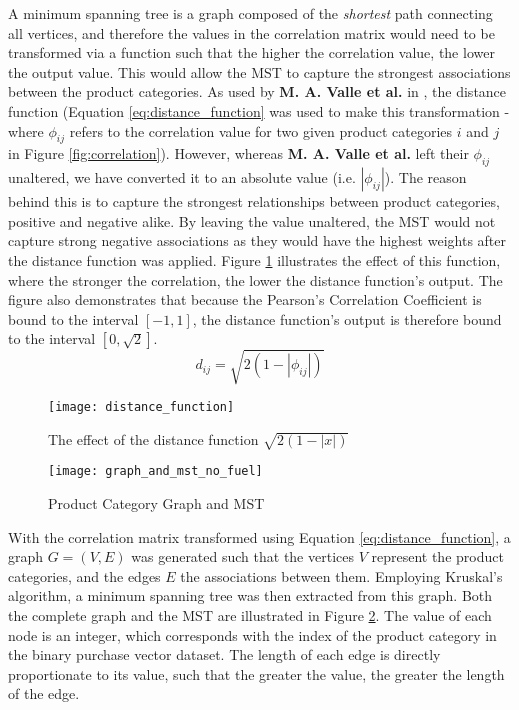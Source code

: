A minimum spanning tree is a graph composed of the \textit{shortest} path connecting all vertices, and therefore the values in the correlation matrix would need to be transformed via a function such that the higher the correlation value, the lower the output value. This would allow the MST to capture the strongest associations between the product categories. As used by \textbf{M. A. Valle et al.} in \cite{mst_paper}, the distance function (Equation \ref{eq:distance_function}  was used to make this transformation - where $\phi_{ij}$ refers to the correlation value for two given product categories $i$ and $j$ in Figure \ref{fig:correlation}). However, whereas \textbf{M. A. Valle et al.} left their $\phi_{ij}$ unaltered, we have converted it to an absolute value (i.e. $|\phi_{ij}|$). The reason behind this is to capture the strongest relationships between product categories, positive and negative alike. By leaving the value unaltered, the MST would not capture strong negative associations as they would have the highest weights after the distance function was applied. Figure \ref{fig:distance_function} illustrates the effect of this function, where the stronger the correlation, the lower the distance function's output. The figure also demonstrates that because the Pearson's Correlation Coefficient is bound to the interval $[-1,1]$, the distance function's output is therefore bound to the interval $[0,\sqrt{2}]$. 
\begin{equation}
\label{eq:distance_function}
d_{ij} = \sqrt{2(1-|\phi_{ij}|)}
\end{equation}

\begin{figure}[H]
\centering
\texttt{[image: distance\_function]}
\label{fig:distance_function}
\caption{The effect of the distance function $\sqrt{2(1-|x|)}$}
\end{figure}

\begin{figure}[H]
\centering
\texttt{[image: graph\_and\_mst\_no\_fuel]}
\caption{Product Category Graph and MST}
\label{fig:graph_mst}
\end{figure}
With the correlation matrix transformed using Equation \ref{eq:distance_function}, a graph $G = (V,E)$ was generated such that the vertices $V$ represent the product categories, and the edges $E$ the associations between them. Employing Kruskal's algorithm, a minimum spanning tree was then extracted from this graph. Both the complete graph and the MST are illustrated in Figure \ref{fig:graph_mst}. The value of each node is an integer, which corresponds with the index of the product category in the binary purchase vector dataset. The length of each edge is directly proportionate to its value, such that the greater the value, the greater the length of the edge.



